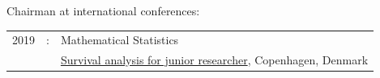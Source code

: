 \documentclass[12pt]{article}
\begin{document}
\bigskip

Chairman at international conferences:

\medskip

\begin{tabular}{l@{ }l@{ }l}
2019 &:& Mathematical Statistics \\
&& \href{https://publicifsv.sund.ku.dk/~safjr2019/}{Survival analysis for junior researcher}, Copenhagen, Denmark
\end{tabular}




\end{document}
